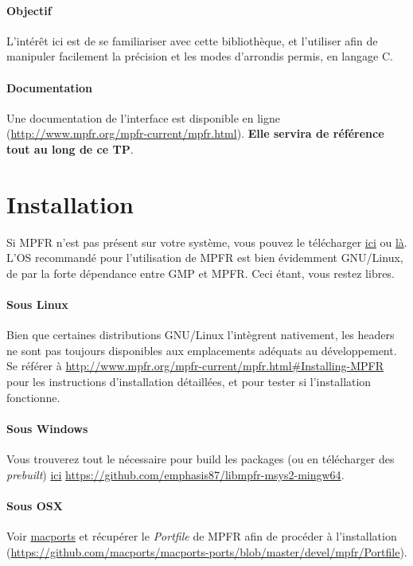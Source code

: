 \documentclass[a4paper,11pt]{exam}
\begin{document}
\paragraph{Objectif} L'intérêt ici est de se familiariser avec cette bibliothèque, et l'utiliser afin de manipuler facilement la précision et les modes d'arrondis permis, en langage C.  
\paragraph{Documentation} Une documentation de l'interface est disponible en ligne (\url{http://www.mpfr.org/mpfr-current/mpfr.html}). \textbf{Elle servira de référence tout au long de ce TP}.

\section{Installation}
Si MPFR n'est pas présent sur votre système, vous pouvez le télécharger \href{http://www.mpfr.org/}{ici} ou \href{https://ftp.gnu.org/gnu/mpfr/}{là}.
L'OS recommandé pour l'utilisation de MPFR est bien évidemment GNU/Linux, de par la forte dépendance entre GMP et MPFR. Ceci étant, vous restez libres.
\paragraph{Sous Linux}
Bien que certaines distributions GNU/Linux l'intègrent nativement, les headers ne sont pas toujours disponibles aux emplacements adéquats au développement.\\
Se référer à \url{http://www.mpfr.org/mpfr-current/mpfr.html\#Installing-MPFR} pour les instructions d'installation détaillées, et pour tester si l'installation fonctionne.

\paragraph{Sous Windows}
Vous trouverez tout le nécessaire pour build les packages (ou en télécharger des \emph{prebuilt}) \href{https://github.com/emphasis87/libmpfr-msys2-mingw64}{ici} \url{https://github.com/emphasis87/libmpfr-msys2-mingw64}.

\paragraph{Sous OSX} 
Voir \href{https://github.com/macports/macports-ports}{macports} et récupérer le \emph{Portfile} de MPFR afin de procéder à l'installation (\url{https://github.com/macports/macports-ports/blob/master/devel/mpfr/Portfile}).
\end{document}
